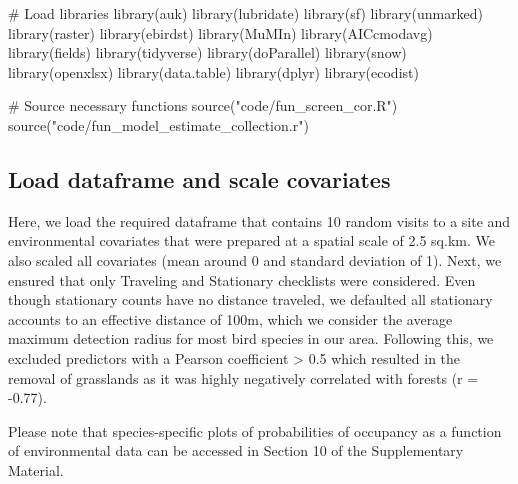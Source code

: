 \documentclass[]{article}
\newenvironment{Shaded}{}{}
\newcommand{\CommentTok}[1]{\textcolor[rgb]{0.00,0.50,0.00}{#1}}
\newcommand{\KeywordTok}[1]{\textcolor[rgb]{0.00,0.00,1.00}{#1}}
\newcommand{\NormalTok}[1]{#1}
\newcommand{\StringTok}[1]{\textcolor[rgb]{0.00,0.50,0.50}{#1}}
\begin{document}
\begin{Shaded}
\begin{Highlighting}[numbers=left,,]
\CommentTok{# Load libraries}
\KeywordTok{library}\NormalTok{(auk)}
\KeywordTok{library}\NormalTok{(lubridate)}
\KeywordTok{library}\NormalTok{(sf)}
\KeywordTok{library}\NormalTok{(unmarked)}
\KeywordTok{library}\NormalTok{(raster)}
\KeywordTok{library}\NormalTok{(ebirdst)}
\KeywordTok{library}\NormalTok{(MuMIn)}
\KeywordTok{library}\NormalTok{(AICcmodavg)}
\KeywordTok{library}\NormalTok{(fields)}
\KeywordTok{library}\NormalTok{(tidyverse)}
\KeywordTok{library}\NormalTok{(doParallel)}
\KeywordTok{library}\NormalTok{(snow)}
\KeywordTok{library}\NormalTok{(openxlsx)}
\KeywordTok{library}\NormalTok{(data.table)}
\KeywordTok{library}\NormalTok{(dplyr)}
\KeywordTok{library}\NormalTok{(ecodist)}

\CommentTok{# Source necessary functions}
\KeywordTok{source}\NormalTok{(}\StringTok{"code/fun_screen_cor.R"}\NormalTok{)}
\KeywordTok{source}\NormalTok{(}\StringTok{"code/fun_model_estimate_collection.r"}\NormalTok{)}
\end{Highlighting}
\end{Shaded}

\hypertarget{load-dataframe-and-scale-covariates}{%
\subsection{Load dataframe and scale covariates}\label{load-dataframe-and-scale-covariates}}

Here, we load the required dataframe that contains 10 random visits to a site and environmental covariates that were prepared at a spatial scale of 2.5 sq.km. We also scaled all covariates (mean around 0 and standard deviation of 1). Next, we ensured that only Traveling and Stationary checklists were considered. Even though stationary counts have no distance traveled, we defaulted all stationary accounts to an effective distance of 100m, which we consider the average maximum detection radius for most bird species in our area. Following this, we excluded predictors with a Pearson coefficient \textgreater{} 0.5 which resulted in the removal of grasslands as it was highly negatively correlated with forests (r = -0.77).

Please note that species-specific plots of probabilities of occupancy as a function of environmental data can be accessed in Section 10 of the Supplementary Material.
\end{document}

